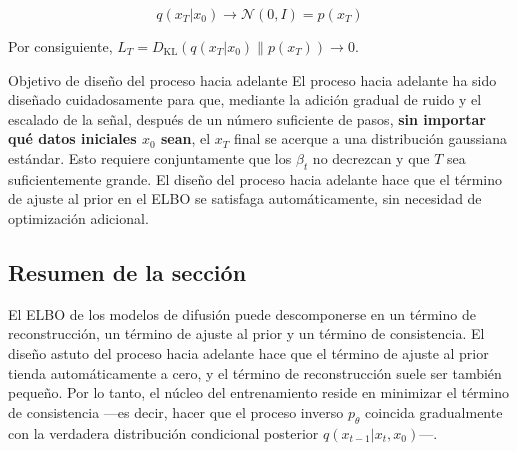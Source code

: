$$q(x_T | x_0) \to \mathcal{N}(0, I) = p(x_T)$$

Por consiguiente, $L_T = D_{\text{KL}}(q(x_T|x_0) \| p(x_T)) \to 0$.

\begin{importantbox}{Objetivo de diseño del proceso hacia adelante}
El proceso hacia adelante ha sido diseñado cuidadosamente para que, mediante la adición gradual de ruido y el escalado de la señal, después de un número suficiente de pasos, \textbf{sin importar qué datos iniciales $x_0$ sean}, el $x_T$ final se acerque a una distribución gaussiana estándar. Esto requiere conjuntamente que los $\beta_t$ no decrezcan y que $T$ sea suficientemente grande. El diseño del proceso hacia adelante hace que el término de ajuste al prior en el ELBO se satisfaga automáticamente, sin necesidad de optimización adicional.
\end{importantbox}

\subsection{Resumen de la sección}

El ELBO de los modelos de difusión puede descomponerse en un término de reconstrucción, un término de ajuste al prior y un término de consistencia. El diseño astuto del proceso hacia adelante hace que el término de ajuste al prior tienda automáticamente a cero, y el término de reconstrucción suele ser también pequeño. Por lo tanto, el núcleo del entrenamiento reside en minimizar el término de consistencia —es decir, hacer que el proceso inverso $p_\theta$ coincida gradualmente con la verdadera distribución condicional posterior $q(x_{t-1}|x_t, x_0)$—.
